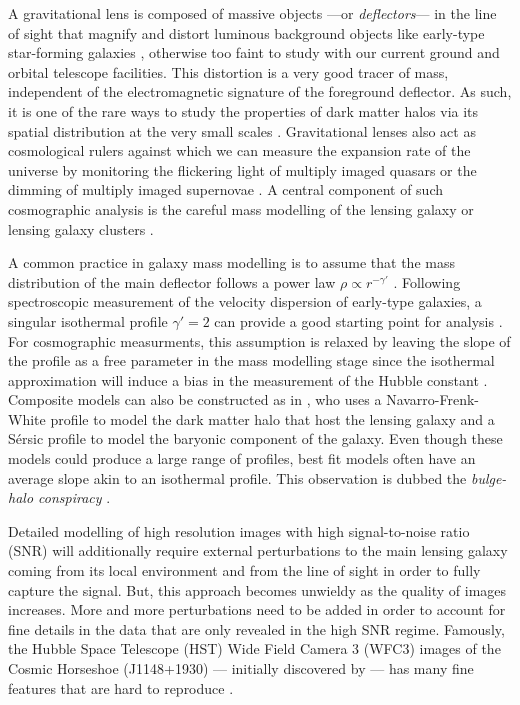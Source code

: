 \documentclass[twocolumn]{aastex631}
\begin{document}
A gravitational lens is composed of 
massive objects ---or \textit{deflectors}--- in the line of sight that 
magnify and distort luminous
background objects like early-type star-forming galaxies \citep{Viera2013,Marrone2018,Rizzo2020,Sun2021},
otherwise too faint to study with our 
current ground and orbital telescope facilities. 
This distortion is a very good tracer of mass, 
independent of the electromagnetic 
signature of the foreground deflector. As such, it 
is one of the rare ways to study the 
properties of dark matter 
halos via its spatial distribution at the very small scales 
\citep{Dala2002,Treu2004,Hezaveh2016,Gilman2020,Gilman2021}. 
Gravitational lenses also act as cosmological rulers against which we can measure the 
expansion rate of the universe by monitoring the flickering light of multiply imaged quasars 
\citep[and reference therein]{Treu2016td,Millon2020} 
or the dimming of multiply imaged supernovae \citep{Refsdal1964,Treu2016refsdal,Grillo2018}. 
A central component of such cosmographic analysis is the 
careful mass modelling of the lensing galaxy \citep{Chen2019,Wong2020} or 
lensing galaxy clusters \citep{Kneib2011,Hoekstra2013,Natarajan2017,Bergamini2018,Jauzac2021}. 


A common practice in galaxy mass modelling is to assume that the mass distribution of the 
main deflector follows a power law $\rho \propto r^{-\gamma'}$ \citep{Keeton2001}.
Following spectroscopic measurement 
of the velocity dispersion of early-type galaxies, 
a singular isothermal profile $\gamma' = 2$ can provide a good starting point for analysis
\citep{Koopman2006,Barnabe2009,Auger2010}. For cosmographic measurments, 
this assumption is relaxed by leaving the slope of the profile as 
a free parameter in the mass modelling stage 
since the isothermal approximation will induce a bias in the measurement 
of the Hubble constant \citep{Treu2004,Birrer2020}. 
Composite models can also be constructed as in \citet{Millon2020}, who 
uses a Navarro-Frenk-White profile 
\citep{Navarro1997} to model the dark matter halo that host the lensing galaxy 
and a Sérsic profile \citep{Sersic1963} 
to model the baryonic component of the galaxy. Even though these models 
could produce a large range of profiles, best fit models often 
have an average slope akin to an isothermal profile. This 
observation is dubbed the \textit{bulge-halo conspiracy} \citep{Dutton2014}.

Detailed modelling of high resolution images with high 
signal-to-noise ratio (SNR) will additionally require external perturbations 
to the main lensing galaxy coming from its local environment 
\citep{Sluse2017,Wong2017,Birrer2019,Rusu2019} and 
from the line of sight \citep{Rusu2017,Li2021} in order to fully capture the signal. 
But, this approach becomes unwieldy as the quality of images increases. 
More and more perturbations need to be added in order 
to account for fine details in the data that are only revealed 
in the high SNR regime. Famously,
the Hubble Space Telescope (HST) Wide Field Camera 3 (WFC3) images of 
the Cosmic Horseshoe (J1148+1930) --- initially discovered by \citet{Belokurov2007} --- 
has many fine features that are hard to reproduce 
\citep[e.g.][]{Bellagamba2016,Cheng2019,Schuldt2019}.
\end{document}
